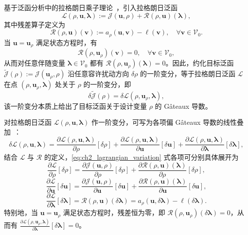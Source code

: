 基于泛函分析中的拉格朗日乘子理论~\cite{luenbergerOptimizationVectorSpace1969}，引入拉格朗日泛函
\[
\mathcal{L}(\rho,\boldsymbol{u},\boldsymbol{\lambda}) := \mathcal{J}(\boldsymbol{u}, \rho) + \mathcal{R}(\rho,\boldsymbol{u})(\boldsymbol\lambda),
\]
其中残差算子定义为
\begin{equation}
	\mathcal{R}(\rho,\boldsymbol{u})(\boldsymbol{v}) := a_\rho(\boldsymbol{u},\boldsymbol{v}) - \ell(\boldsymbol{v}),\quad\forall\boldsymbol{v}\in\mathcal{V}_0.
	\label{eq:ch2_residual_operator}
\end{equation}
当 $\boldsymbol{u}=\boldsymbol{u}_\rho$ 满足状态方程时，有
\[
\mathcal{R}(\rho,\boldsymbol{u}_\rho)(\boldsymbol{v}) = 0,\quad\forall\boldsymbol{v}\in\mathcal{V}_0,
\]
从而对任意伴随变量 $\boldsymbol{\lambda}\in\mathcal{V}_0$ 都有 $\mathcal{R}(\rho,\boldsymbol{u}_\rho)(\boldsymbol{\lambda}) = 0$。因此，约化目标泛函 $\tilde{\mathcal{J}}(\rho) := \mathcal{J}(\boldsymbol{u}_\rho, \rho)$ 沿任意容许扰动方向 $\delta\rho$ 的一阶变分，等于拉格朗日泛函 $\mathcal{L}$ 在点 $(\rho,\boldsymbol{u}_\rho,\boldsymbol{\lambda})$ 处关于 $\rho$ 的一阶变分，即
\[
\delta\tilde{\mathcal{J}}(\rho) = \delta\mathcal{L}(\rho,\boldsymbol{u}_\rho,\boldsymbol{\lambda}),
\]
该一阶变分本质上给出了目标泛函关于设计变量 $\rho$ 的 Gâteaux 导数。

对拉格朗日泛函 $\mathcal{L}(\rho,\boldsymbol{u},\boldsymbol{\lambda})$ 作一阶变分，可写为各项偏 Gâteaux 导数的线性叠加~\cite{luenbergerOptimizationVectorSpace1969}：
\begin{equation} 
	\delta\mathcal{L}(\rho,\boldsymbol{u},\boldsymbol{\lambda}) = \frac{\partial\mathcal{L}(\rho,\boldsymbol{u},\boldsymbol{\lambda})}{\partial\rho}[\delta\rho] + \frac{\partial\mathcal{L}(\rho,\boldsymbol{u},\boldsymbol{\lambda})}{\partial\boldsymbol{u}}[\delta\boldsymbol{u}] + \frac{\partial\mathcal{L}(\rho,\boldsymbol{u},\boldsymbol{\lambda})}{\partial\boldsymbol\lambda}[\delta\boldsymbol\lambda],
	\label{eq:ch2_lagrangian_variation}
\end{equation}
结合 $\mathcal{L}$ 与 $\mathcal{R}$ 的定义，\eqref{eq:ch2_lagrangian_variation} 式各项可分别具体展开为
\[
\frac{\partial\mathcal{L}}{\partial\rho}[\delta\rho] = \frac{\partial\mathcal{J}( \boldsymbol{u},\rho)}{\partial\rho}[\delta\rho] + \frac{\partial\mathcal{R}(\rho,\boldsymbol{u})(\boldsymbol\lambda)}{\partial\rho}[\delta\rho],
\]
\[
\frac{\partial\mathcal{L}}{\partial\boldsymbol{u}}[\delta\boldsymbol{u}] = \frac{\partial\mathcal{J}( \boldsymbol{u},\rho)}{\partial\boldsymbol{u}}[\delta\boldsymbol{u}] + \frac{\partial\mathcal{R}(\rho,\boldsymbol{u})(\boldsymbol\lambda)}{\partial\boldsymbol{u}}[\delta\boldsymbol{u}],
\]
\[
\frac{\partial\mathcal{L}}{\partial\boldsymbol\lambda}[\delta\boldsymbol\lambda] = \mathcal{R}(\rho,\boldsymbol{u})(\delta\boldsymbol{\lambda}) = a_\rho(\boldsymbol{u},\delta\boldsymbol\lambda) - \ell(\delta\boldsymbol\lambda).
\]
特别地，当 $\boldsymbol{u}=\boldsymbol{u}_\rho$ 满足状态方程时，残差恒为零，即 $\mathcal{R}(\rho,\boldsymbol{u}_\rho)(\delta\boldsymbol{\lambda})=0$，从而有 $\frac{\partial\mathcal{L}(\rho,\boldsymbol{u}_\rho,\boldsymbol{\lambda})}{\partial\boldsymbol\lambda}[\delta\boldsymbol\lambda] = 0$。

